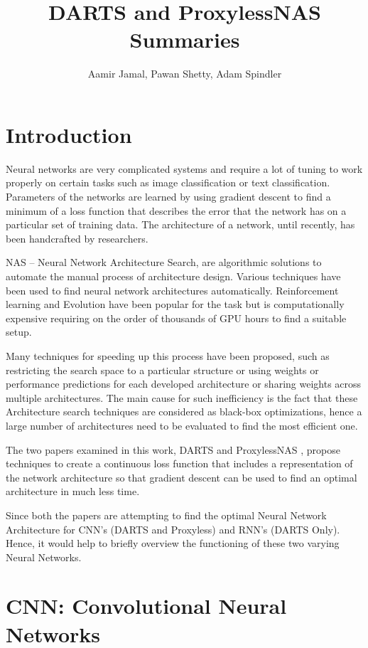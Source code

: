\documentclass{ieee}
\title{DARTS and ProxylessNAS Summaries}
\author{Aamir Jamal, Pawan Shetty, Adam Spindler}
\begin{document}
\maketitle

\section{Introduction}
Neural networks are very complicated systems and require a lot of tuning to work properly on certain tasks such as image classification or text classification. Parameters of the networks are learned by using gradient descent to find a minimum of a loss function that describes the error that the network has on a particular set of training data. The architecture of a network, until recently, has been handcrafted by researchers.


NAS – Neural Network Architecture Search, are algorithmic solutions to automate the manual process of architecture design. Various techniques have been used to find neural network architectures automatically. Reinforcement learning and Evolution have been popular for the task but is computationally expensive requiring on the order of thousands of GPU hours to find a suitable setup. 

Many techniques for speeding up this process have been proposed, such as restricting the search space to a particular structure or using weights or performance predictions for each developed architecture or sharing weights across multiple architectures. The main cause for such inefficiency is the fact that these Architecture search techniques are considered as black-box optimizations, hence a large number of architectures need to be evaluated to find the most efficient one. 

The two papers examined in this work, DARTS \cite{DARTSMODEL} and ProxylessNAS \cite{cai2018proxylessnas}, propose techniques to create a continuous loss function that includes a representation of the network architecture so that gradient descent can be used to find an optimal architecture in much less time.

Since both the papers are attempting to find the optimal Neural Network Architecture for CNN's (DARTS and Proxyless) and RNN's (DARTS Only). Hence, it would help to briefly overview the functioning of these two varying Neural Networks.


\section{CNN: Convolutional Neural Networks}
\end{document}
